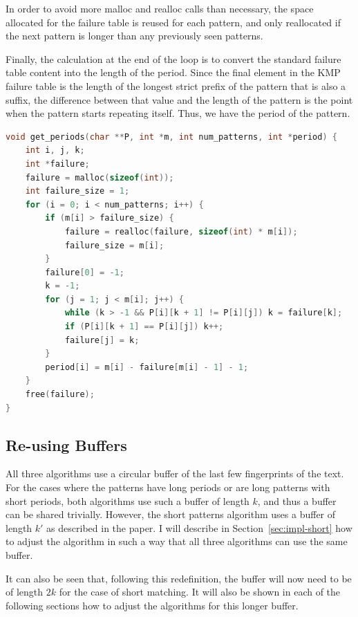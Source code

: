 \documentclass[ %
                    author={Dominic Joseph Moylett},
                    degree={MEng},
                     title={Dictionary Matching with Fingerprints},
                  subtitle={An Empirical Analysis},
                      type={Research},
                      year={2014} ]{dissertation}
\begin{document}
In order to avoid more malloc and realloc calls than necessary, the space allocated for the failure table is reused for each pattern, and only reallocated if the next pattern is longer than any previously seen patterns.

Finally, the calculation at the end of the loop is to convert the standard failure table content into the length of the period. Since the final element in the KMP failure table is the length of the longest strict prefix of the pattern that is also a suffix, the difference between that value and the length of the pattern is the point when the pattern starts repeating itself. Thus, we have the period of the pattern.

\begin{lstlisting}[float={t},caption={Computing the period length $|\rho_i|$ for each pattern.},label={lst:get-periods},language=C]
void get_periods(char **P, int *m, int num_patterns, int *period) {
    int i, j, k;
    int *failure;
    failure = malloc(sizeof(int));
    int failure_size = 1;
    for (i = 0; i < num_patterns; i++) {
        if (m[i] > failure_size) {
            failure = realloc(failure, sizeof(int) * m[i]);
            failure_size = m[i];
        }
        failure[0] = -1;
        k = -1;
        for (j = 1; j < m[i]; j++) {
            while (k > -1 && P[i][k + 1] != P[i][j]) k = failure[k];
            if (P[i][k + 1] == P[i][j]) k++;
            failure[j] = k;
        }
        period[i] = m[i] - failure[m[i] - 1] - 1;
    }
    free(failure);
}
\end{lstlisting}

\subsection{Re-using Buffers}

All three algorithms use a circular buffer of the last few fingerprints of the text. For the cases where the patterns have long periods or are long patterns with short periods, both algorithms use such a buffer of length $k$, and thus a buffer can be shared trivially. However, the short patterns algorithm uses a buffer of length $k'$ as described in the paper. I will describe in Section~\ref{sec:impl-short} how to adjust the algorithm in such a way that all three algorithms can use the same buffer.

It can also be seen that, following this redefinition, the buffer will now need to be of length $2k$ for the case of short matching. It will also be shown in each of the following sections how to adjust the algorithms for this longer buffer.
\end{document}
